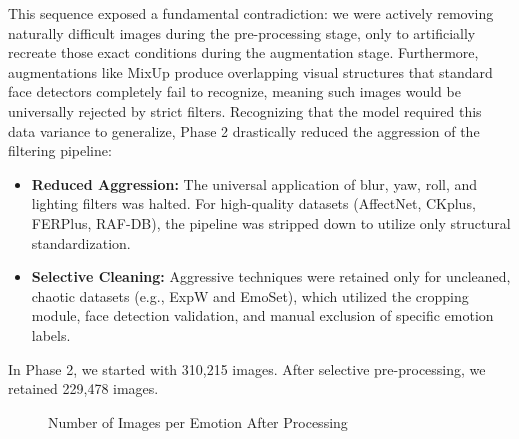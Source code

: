 This sequence exposed a fundamental contradiction: we were actively removing naturally difficult images during the pre-processing stage, only to artificially recreate those exact conditions during the augmentation stage. Furthermore, augmentations like MixUp produce overlapping visual structures that standard face detectors completely fail to recognize, meaning such images would be universally rejected by strict filters. Recognizing that the model required this data variance to generalize, Phase 2 drastically reduced the aggression of the filtering pipeline:
\begin{itemize}
    \item \textbf{Reduced Aggression:} The universal application of blur, yaw, roll, and lighting filters was halted. For high-quality datasets (AffectNet, CKplus, FERPlus, RAF-DB), the pipeline was stripped down to utilize only structural standardization.
    \item \textbf{Selective Cleaning:} Aggressive techniques were retained only for uncleaned, chaotic datasets (e.g., ExpW and EmoSet), which utilized the cropping module, face detection validation, and manual exclusion of specific emotion labels.
\end{itemize}
In Phase 2, we started with 310,215 images. After selective pre-processing, we retained 229,478 images.


\begin{figure}[ht]
\centering
{}
\caption{Number of Images per Emotion After Processing}
\label{fig:processed_images_distribution}
\end{figure}

